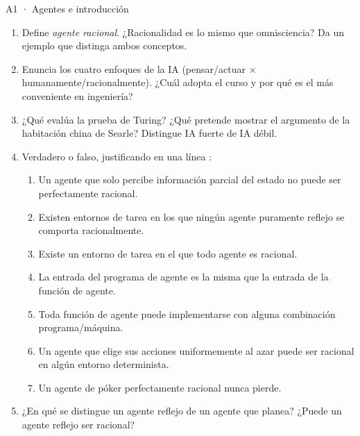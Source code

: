 \begin{ejercicio}{A1 · Agentes e introducción }
\begin{enumerate}[label=\textbf{\arabic*.}]
\item Define \emph{agente racional}. ¿Racionalidad es lo mismo que omnisciencia? Da un ejemplo que
distinga ambos conceptos.
\item Enuncia los cuatro enfoques de la IA (pensar/actuar $\times$ humanamente/racionalmente).
¿Cuál adopta el curso y por qué es el más conveniente en ingeniería?
\item ¿Qué evalúa la prueba de Turing? ¿Qué pretende mostrar el argumento de la habitación
china de Searle? Distingue IA fuerte de IA débil.
\item Verdadero o falso, justificando en una línea :
\begin{enumerate}[label=(\alph*)]
\item Un agente que solo percibe información parcial del estado no puede ser perfectamente racional.
\item Existen entornos de tarea en los que ningún agente puramente reflejo se comporta racionalmente.
\item Existe un entorno de tarea en el que todo agente es racional.
\item La entrada del programa de agente es la misma que la entrada de la función de agente.
\item Toda función de agente puede implementarse con alguna combinación programa/máquina.
\item Un agente que elige sus acciones uniformemente al azar puede ser racional en algún entorno determinista.
\item Un agente de póker perfectamente racional nunca pierde.
\end{enumerate}
\item ¿En qué se distingue un agente reflejo de un agente que planea? ¿Puede un agente reflejo ser racional?
\end{enumerate}
\end{ejercicio}

